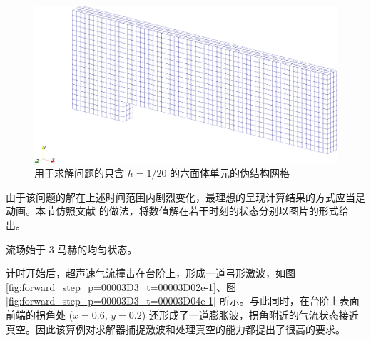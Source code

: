 \begin{figure}[h!]
\begin{centering}
\includegraphics[width=1\textwidth,height=0.28\textheight,keepaspectratio]{../mdpi/figures/forward_step/mesh}
\par\end{centering}
\caption{\label{fig:forward_step_domain}用于求解问题的只含
$h=1/20$ 的六面体单元的伪结构网格}
\end{figure}

由于该问题的解在上述时间范围内剧烈变化，最理想的呈现计算结果的方式应当是动画。本节仿照文献 \cite{Woodward_1984}
的做法，将数值解在若干时刻的状态分别以图片的形式给出。

流场始于 $3$ 马赫的均匀状态。

计时开始后，超声速气流撞击在台阶上，形成一道弓形激波，如图 \ref{fig:forward_step_p=00003D3_t=00003D02e-1}、图
\ref{fig:forward_step_p=00003D3_t=00003D04e-1} 所示。与此同时，在台阶上表面前端的拐角处
($x=0.6$, $y=0.2$) 还形成了一道膨胀波，拐角附近的气流状态接近真空。因此该算例对求解器捕捉激波和处理真空的能力都提出了很高的要求。

